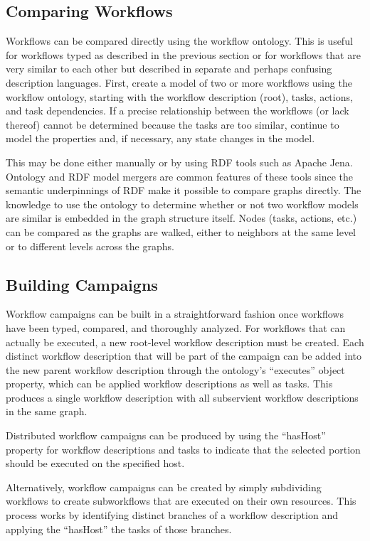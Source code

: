 \subsection{Comparing Workflows}

Workflows can be compared directly using the workflow ontology. This is useful
for workflows typed as described in the previous section or for workflows that
are very similar to each other but described in separate and perhaps confusing
description languages. First, create a model of two or more workflows using the
workflow ontology, starting with the workflow description (root), tasks,
actions, and task dependencies. If a precise relationship between the workflows
(or lack thereof) cannot be determined because the tasks are too similar,
continue to model the properties and, if necessary, any state changes in the
model.

This may be done either manually or by using RDF tools such as Apache Jena.
Ontology and RDF model mergers are common features of these tools since the
semantic underpinnings of RDF make it possible to compare graphs directly. The
knowledge to use the ontology to determine whether or not two workflow models
are similar is embedded in the graph structure itself. Nodes
(tasks, actions, etc.) can be compared as the graphs are walked, either to
neighbors at the same level or to different levels across the graphs.

\subsection{Building Campaigns}

Workflow campaigns can be built in a straightforward fashion once workflows have
been typed, compared, and thoroughly analyzed. For workflows that can actually
be executed, a new root-level workflow description must be created. Each
distinct workflow description that will be part of the campaign can be added
into the new parent workflow description through the ontology's
``executes'' object property, which can be applied workflow descriptions as
well as tasks. This produces a single workflow description with all subservient
workflow descriptions in the same graph.

Distributed workflow campaigns can be produced by using the ``hasHost'' property
for workflow descriptions and tasks to indicate that the selected portion should
be executed on the specified host.

Alternatively, workflow campaigns can be created by simply subdividing
workflows to create subworkflows that are executed on their own resources. This
process works by identifying distinct branches of a workflow description and
applying the ``hasHost'' the tasks of those branches. 

